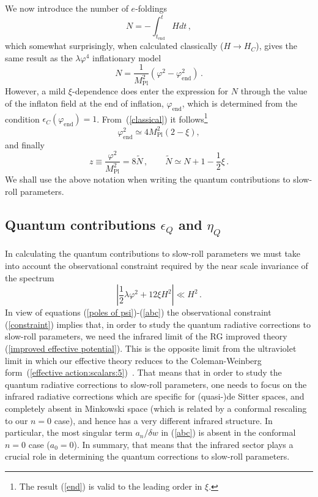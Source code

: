\documentclass[aps,12pt,superscriptaddress,preprintnumbers,
                secnumarabic,nofootinbib,showpacs]{revtex4}
\begin{document}
 We now introduce the number of $e$-foldings
\begin{equation}
N = -\int_{t_{\mathrm{end}}}^t H dt
\,,
\end{equation}
which somewhat surprisingly, when calculated classically
($H\rightarrow H_C$), gives the same result as the
${\lambda\varphi^4}$ inflationary model
\begin{equation}
N = \frac{1}{M_{\mathrm{Pl}}^2}\left(\varphi^2-
\varphi^2_{\mathrm{end}}\right)
\,.
\end{equation}
However, a mild $\xi$-dependence does enter the expression for $N$
through the value of the inflaton field at the end of inflation,
$\varphi_{\mathrm{end}}$, which is determined from the condition
$\epsilon_C(\varphi_{\mathrm{end}})=1$. From~(\ref{classical}) it
follows\footnote{The result (\ref{end}) is valid to the leading
order in $\xi$.}
\begin{equation}
\varphi^2_{\mathrm{end}} \simeq 4M^2_{\mathrm{Pl}}(2-\xi),\label{end}
\end{equation}
and finally
\begin{equation}
z\equiv \frac{\varphi^2}{M_{\mathrm{Pl}}^2} = 8\tilde{N}
\,,\qquad
\tilde{N}\simeq N+1-\frac12\xi
\,.
\label{z}
\end{equation}
We shall use the above notation when writing
the quantum contributions to slow-roll parameters.

\subsection{Quantum contributions $\epsilon_Q$ and $\eta_Q$}

In calculating the quantum contributions to slow-roll parameters we
must take into account the observational constraint required by
the near scale invariance of the spectrum
\begin{equation}
\left|\frac12\lambda\varphi^2+ 12\xi H^2 \right|\ll H^2\,.
\label{constraint}
\end{equation}
In view of equations (\ref{poles of psi})-(\ref{abc}) the
observational constraint (\ref{constraint}) implies that, in order
to study the quantum radiative corrections to slow-roll
parameters, we need the infrared limit of the RG improved theory
(\ref{improved effective potential}). This is the opposite limit
from the ultraviolet limit in which our effective theory reduces
to the Coleman-Weinberg form~(\ref{effective
action:scalars:5})~\cite{ColemanWeinberg:1973}. That means that in
order to study the quantum radiative corrections to slow-roll
parameters, one needs to focus on the infrared radiative
corrections which are specific for (quasi-)de Sitter spaces, and
completely absent in Minkowski space (which is related by a
conformal rescaling to our $n=0$ case), and hence has a very
different infrared structure. In particular, the most singular term
${a_n}/{\delta w}$ in (\ref{abc}) is absent in the conformal $n=0$
case ($a_0=0$). In summary, that means that the infrared sector plays a
crucial role in determining the quantum corrections to slow-roll
parameters.
\end{document}

